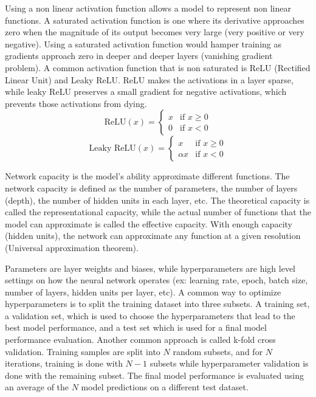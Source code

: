 \documentclass{article}
\begin{document}
Using a non linear activation function allows a model to represent non linear functions. A saturated activation function is one where its derivative approaches zero when the magnitude of its output becomes very large (very positive or very negative). Using a saturated activation function would hamper training as gradients approach zero in deeper and deeper layers (vanishing gradient problem). A common activation function that is non saturated is ReLU (Rectified Linear Unit) and Leaky ReLU. ReLU makes the activations in a layer sparse, while leaky ReLU preserves a small gradient for negative activations, which prevents those activations from dying.
\[ \text{ReLU}(x) = \begin{cases} x & \text{if } x \geq 0 \\ 0 & \text{if } x < 0 \end{cases} \]
\[ \text{Leaky ReLU}(x) = \begin{cases} x & \text{if } x \geq 0 \\ \alpha x & \text{if } x < 0 \end{cases} \]

Network capacity is the model's ability approximate different functions. The network capacity is defined as the number of parameters, the number of layers (depth), the number of hidden units in each layer, etc. The theoretical capacity is called the representational capacity, while the actual number of functions that the model can approximate is called the effective capacity. With enough capacity (hidden units), the network can approximate any function at a given resolution (Universal approximation theorem).

Parameters are layer weights and biases, while hyperparameters are high level settings on how the neural network operates (ex: learning rate, epoch, batch size, number of layers, hidden units per layer, etc). A common way to optimize hyperparameters is to split the training dataset into three subsets. A training set, a validation set, which is used to choose the hyperparameters that lead to the best model performance, and a test set which is used for a final model performance evaluation. Another common approach is called k-fold cross validation. Training samples are split into $N$ random subsets, and for $N$ iterations, training is done with $N - 1$ subsets while hyperparameter validation is done with the remaining subset. The final model performance is evaluated using an average of the $N$ model predictions on a different test dataset.
\end{document}
